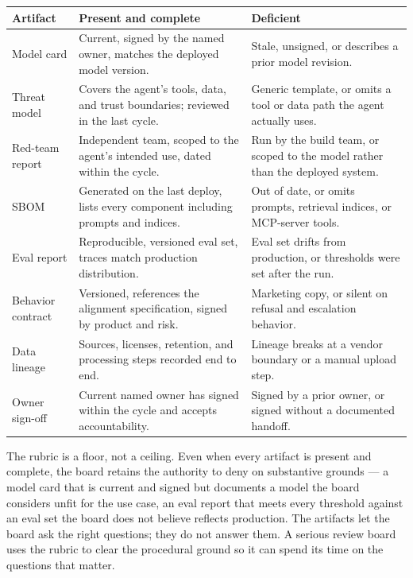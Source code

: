 \stoptwocol
\begin{center}
\small
\begin{tabular}{@{}p{3.4cm}p{5.6cm}p{5.6cm}@{}}
\toprule
\textbf{Artifact} & \textbf{Present and complete} & \textbf{Deficient} \\
\midrule
Model card & Current, signed by the named owner, matches the deployed model version. & Stale, unsigned, or describes a prior model revision. \\
\addlinespace
Threat model & Covers the agent's tools, data, and trust boundaries; reviewed in the last cycle. & Generic template, or omits a tool or data path the agent actually uses. \\
\addlinespace
Red-team report & Independent team, scoped to the agent's intended use, dated within the cycle. & Run by the build team, or scoped to the model rather than the deployed system. \\
\addlinespace
SBOM & Generated on the last deploy, lists every component including prompts and indices. & Out of date, or omits prompts, retrieval indices, or MCP-server tools. \\
\addlinespace
Eval report & Reproducible, versioned eval set, traces match production distribution. & Eval set drifts from production, or thresholds were set after the run. \\
\addlinespace
Behavior contract & Versioned, references the alignment specification, signed by product and risk. & Marketing copy, or silent on refusal and escalation behavior. \\
\addlinespace
Data lineage & Sources, licenses, retention, and processing steps recorded end to end. & Lineage breaks at a vendor boundary or a manual upload step. \\
\addlinespace
Owner sign-off & Current named owner has signed within the cycle and accepts accountability. & Signed by a prior owner, or signed without a documented handoff. \\
\bottomrule
\end{tabular}
\end{center}
\starttwocol

The rubric is a floor, not a ceiling. Even when every artifact is present and complete, the board retains the authority to deny on substantive grounds --- a model card that is current and signed but documents a model the board considers unfit for the use case, an eval report that meets every threshold against an eval set the board does not believe reflects production. The artifacts let the board ask the right questions; they do not answer them. A serious review board uses the rubric to clear the procedural ground so it can spend its time on the questions that matter.

